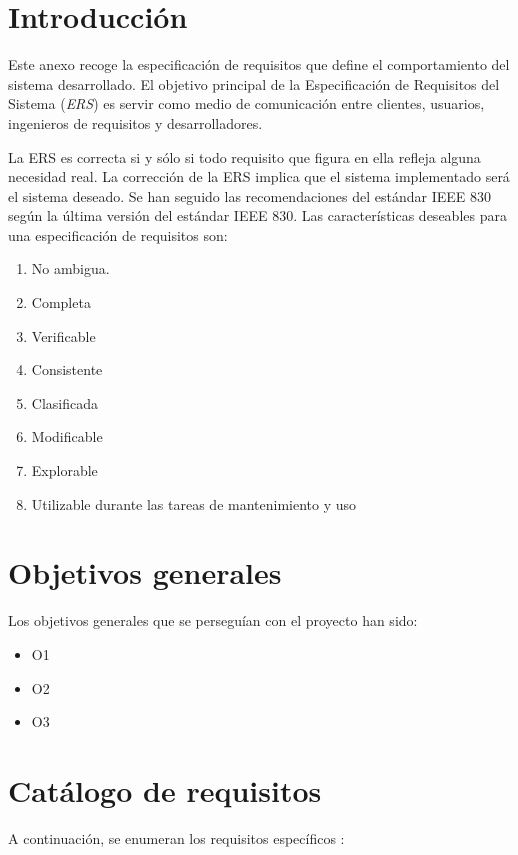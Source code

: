 
\section{Introducción}\label{introduccion-requisitos}

Este anexo recoge la especificación de requisitos que define el comportamiento del sistema desarrollado. El objetivo principal de la Especificación de Requisitos del Sistema (\emph{ERS}) es servir como medio de comunicación entre clientes, usuarios, ingenieros de requisitos y desarrolladores.

La ERS es correcta si y sólo si todo requisito que figura en ella refleja alguna necesidad
real. La corrección de la ERS implica que el sistema implementado será el sistema
deseado. Se han seguido las recomendaciones del estándar IEEE 830 según la última versión del estándar IEEE 830. Las características deseables para una especificación de requisitos son:


\begin{enumerate}
	\item No ambigua.
	\item Completa
	\item  Verificable
	\item  Consistente
	\item  Clasificada
	\item  Modificable
	\item  Explorable
	\item  Utilizable durante las tareas de mantenimiento y uso
\end{enumerate}


\section{Objetivos generales}\label{objetivos-generales}
Los objetivos generales que se perseguían con el proyecto han sido:
\begin{itemize}
	\item O1
	\item O2
	\item O3
\end{itemize}


\section{Catálogo de requisitos}\label{catalogo-requisitos}
A continuación, se enumeran los requisitos específicos :

